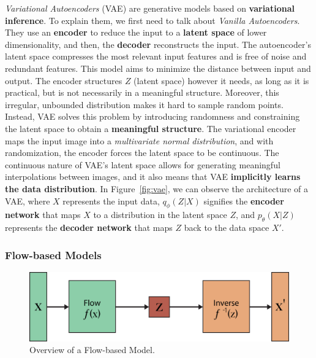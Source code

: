 \documentclass[preprint]{elsarticle}
\begin{document}
\emph{Variational Autoencoders} (VAE) \cite{kingma2022autoencoding} are generative models based on \textbf{variational inference}.
To explain them, we first need to talk about \emph{Vanilla Autoencoders}.
They use an \textbf{encoder} to reduce the input to a \textbf{latent space} of lower dimensionality, and then, the \textbf{decoder} reconstructs the input. 
The autoencoder's latent space compresses the most relevant input features and is free of noise and redundant features.
This model aims to minimize the distance between input and output. The encoder structures $Z$ (latent space) however it needs, as long as it is practical, but is not necessarily in a meaningful structure. 
Moreover, this irregular, unbounded distribution makes it hard to sample random points.
Instead, VAE solves this problem by introducing randomness and constraining the latent space to obtain a \textbf{meaningful structure}. 
The variational encoder maps the input image into a \emph{multivariate normal distribution}, and with randomization, the encoder forces the latent space to be continuous. 
The continuous nature of VAE's latent space allows for generating meaningful interpolations between images, and it also means that VAE \textbf{implicitly learns the data distribution}. In Figure~\ref{fig:vae}, we can observe the architecture of a VAE, where $X$ represents the input data, $q_\phi(Z|X)$ signifies the \textbf{encoder network} that maps $X$ to a distribution in the latent space $Z$, and $p_\theta(X|Z)$ represents the \textbf{decoder network} that maps $Z$ back to the data space $X'$.

\subsubsection{Flow-based Models} \label{sec:flow}
\begin{figure}[b]
	\centering
    \includegraphics[scale=0.8]{img/svg/FB.png}
    \caption{Overview of a Flow-based Model.}\label{fig:flow}
\end{figure}
\end{document}

